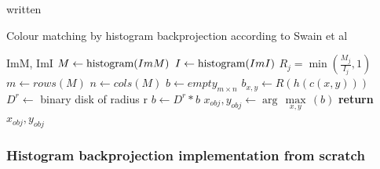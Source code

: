 \documentclass[a4paper]{article}
\begin{document}
written
\begin{algorithm}[H]
\caption{Colour matching by histogram backprojection according to Swain et al}
\label{alg:hist_backproj}
\begin{algorithmic}[1]
 {ImM, ImI} 
\State $M\leftarrow \textup{histogram}(ImM)$
\State $I\leftarrow \textup{histogram}(ImI)$
 
\State $R_j = \min\left(\frac{M_j}{I_j}, 1\right)$ 
\EndFor
\State $m \leftarrow rows(M)$
\State $n \leftarrow cols(M)$
\State $b \leftarrow empty_{m \times n}$
\State $b_{x,y} \leftarrow R(h(c(x,y)))$ 
\EndFor
\EndFor
\State $D^r\leftarrow$ \textup{binary disk of radius r}
\State $b \leftarrow D^r \ast b$ 
\State $x_{obj},y_{obj} \leftarrow \arg \, \underset{x,y}{\mathop{\max }}\,(b)$
\State \textbf{return}  $x_{obj},y_{obj}$
\EndProcedure
\end{algorithmic}
\end{algorithm}

\subsubsection{Histogram backprojection implementation from scratch}
\end{document}
